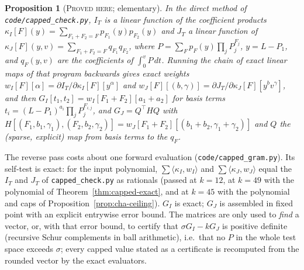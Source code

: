 \documentclass[11pt]{amsart}
\newtheorem{proposition}[theorem]{Proposition}
\theoremstyle{definition}
\theoremstyle{remark}
\newcommand{\lbl}[1]{\textup{\textsc{#1}}}
\begin{document}
\begin{proposition}[\lbl{Proved here}; elementary]\label{prop:adjoint}
In the direct method of \texttt{code/capped\_check.py}, $I_T$ is a linear
function of the coefficient products
$\kappa_I[F](y)=\sum_{F_1+F_2=F}p_{F_1}(y)p_{F_2}(y)$ and $J_T$ a linear
function of $\kappa_J[F](y,v)=\sum_{F_1+F_2=F}q_{F_1}q_{F_2}$, where
$P=\sum_Fp_F(y)\prod_jP_j^{F_j}$, $y=L-P_1$, and
$q_F(y,v)$ are the coefficients of $\int_0^vP\,dt$. Running the chain of
exact linear maps of that program backwards gives exact weights
$w_I[F][\alpha]=\partial I_T/\partial\kappa_I[F][y^\alpha]$ and
$w_J[F][(b,\gamma)]=\partial J_T/\partial\kappa_J[F][y^bv^\gamma]$, and then
$G_I[t_1,t_2]=w_I[F_1+F_2][a_1+a_2]$ for basis terms
$t_i=(L-P_1)^{a_i}\prod_jP_j^{F_{i,j}}$, and $G_J=Q^{\top}HQ$ with
$H[(F_1,b_1,\gamma_1),(F_2,b_2,\gamma_2)]=w_J[F_1+F_2][(b_1+b_2,\gamma_1+\gamma_2)]$
and $Q$ the (sparse, explicit) map from basis terms to the $q_F$.
\end{proposition}
\begin{sloppypar}
The reverse pass costs about one forward evaluation
(\texttt{code/capped\_gram.py}). Its self-test is exact: for the input
polynomial, $\sum\langle\kappa_I,w_I\rangle$ and
$\sum\langle\kappa_J,w_J\rangle$ equal the $I_T$ and $J_T$ of
\texttt{capped\_check.py} as rationals (passed at $k=12$, at $k=49$ with the
polynomial of Theorem~\ref{thm:capped-exact}, and at $k=45$ with the
polynomial and caps of Proposition~\ref{prop:cha-ceiling}). $G_I$ is exact; $G_J$ is assembled in fixed point
with an explicit entrywise error bound. The matrices are only used to
\emph{find} a vector, or, with that error bound, to certify that
$\sigma G_I-kG_J$ is positive definite (recursive Schur complements in ball
arithmetic), i.e.\ that no $P$ in the whole test space exceeds $\sigma$; every capped value stated as a
certificate is recomputed from the rounded vector by the exact evaluators.
\end{sloppypar}
\end{document}
